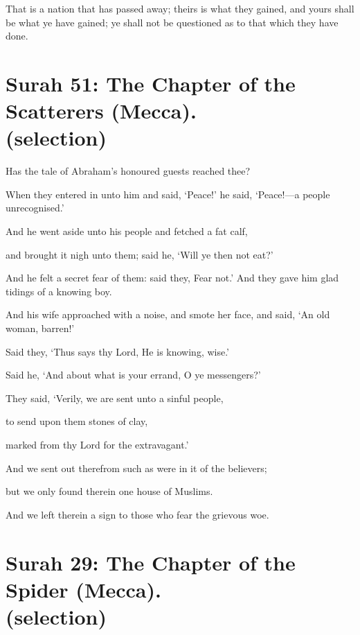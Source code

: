 \documentclass[fontsize=14pt, letterpaper, notitlepage, openany, DIV=12]{scrbook} %
\begin{document}
\noindent[2:141]
That is a nation that has passed away; theirs is what they gained, and yours shall be what
ye have gained; ye shall not be questioned as to that which they have done.


\section[Surah 51: The Chapter of the Scatterers (Mecca).]{Surah 51: The Chapter of the Scatterers (Mecca).\\ (selection)}


\noindent[51:24]
Has the tale of Abraham's honoured guests reached thee?

\noindent[51:25]
When they entered in unto him and said, `Peace!' he said, `Peace!---a people
unrecognised.'

\noindent[51:26]
And he went aside unto his people and fetched a fat calf,

\noindent[51:27]
and brought it nigh unto them; said he, `Will ye then not eat?'

\noindent[51:28]
And he felt a secret fear of them: said they, Fear not.' And they gave him glad tidings of
a knowing boy.

\noindent[51:29]
And his wife approached with a noise, and smote her face, and said, `An old woman,
barren!'

\noindent[51:30]
Said they, `Thus says thy Lord, He is knowing, wise.'

\noindent[51:31]
Said he, `And about what is your errand, O ye messengers?'

\noindent[51:32]
They said, `Verily, we are sent unto a sinful people,

\noindent[51:33]
to send upon them stones of clay,

\noindent[51:34]
marked from thy Lord for the extravagant.'

\noindent[51:35]
And we sent out therefrom such as were in it of the believers;

\noindent[51:36]
but we only found therein one house of Muslims.

\noindent[51:37]
And we left therein a sign to those who fear the grievous woe.


\section[Surah 29: The Chapter of the Spider (Mecca).]{Surah 29: The Chapter of the Spider (Mecca).\\ (selection)}
\end{document}
